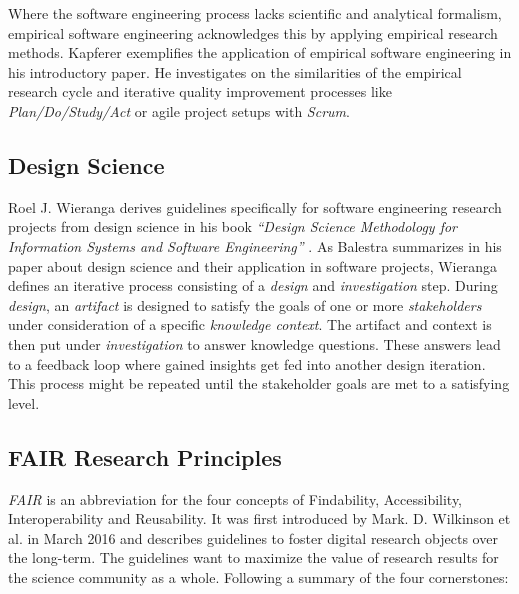 \documentclass[12pt,a4paper]{article}
\begin{document}
Where the software engineering process lacks scientific and analytical formalism, empirical software engineering acknowledges this by applying empirical research methods. Kapferer \cite{kapferer:2019:empirical} exemplifies the application of empirical software engineering in his introductory paper. He investigates on the similarities of the empirical research cycle and iterative quality improvement processes like \emph{Plan/Do/Study/Act} \cite{deming} or agile project setups with \emph{Scrum}.

\subsection{Design Science}

Roel J. Wieranga derives guidelines specifically for software engineering research projects from design science in his book \emph{``Design Science Methodology for Information Systems and Software Engineering''} \cite{wieringa}. As Balestra \cite{balestra:2019:designscience:articactandcontext} summarizes in his paper about design science and their application in software projects, Wieranga \cite{wieringa} defines an iterative process consisting of a \emph{design} and \emph{investigation} step. During \emph{design}, an \emph{artifact} is designed to satisfy the goals of one or more \emph{stakeholders} under consideration of a specific \emph{knowledge context}. The artifact and context is then put under \emph{investigation} to answer knowledge questions. These answers lead to a feedback loop where gained insights get fed into another design iteration. This process might be repeated until the stakeholder goals are met to a satisfying level.

\subsection{FAIR Research Principles}
\label{sec:fair}

\emph{FAIR} is an abbreviation for the four concepts of Findability, Accessibility, Interoperability and Reusability. It was first introduced by Mark. D. Wilkinson et al. in March 2016 \cite{wilkinson:2016} and describes guidelines to foster digital research objects over the long-term. The guidelines want to maximize the value of research results for the science community as a whole. Following a summary of the four cornerstones:
\end{document}
